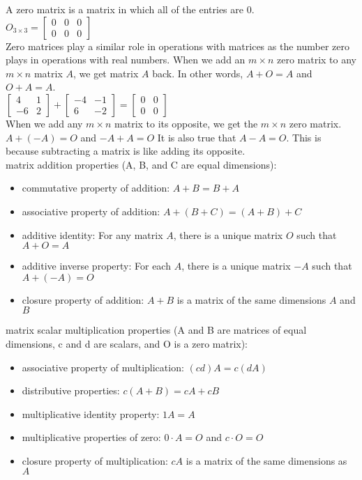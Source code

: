 \documentclass{article}
\begin{document}
A zero matrix is a matrix in which all of the entries are 0.\\

$O_{3 \times 3} = 
\begin{bmatrix}
	0 & 0 & 0\\
	0 & 0 & 0
\end{bmatrix}
$\\

Zero matrices play a similar role in operations with matrices as the number zero plays in operations with real numbers. When we add an $m \times n$ zero matrix to any $m \times n$ matrix $A$, we get matrix $A$ back. In other words, $A + O = A$ and $O + A = A$.\\

$
\begin{bmatrix}
	4 & 1\\
	-6 & 2
\end{bmatrix}
+
\begin{bmatrix}
	-4 & -1\\
	6 & -2
\end{bmatrix}
=
\begin{bmatrix}
	0 & 0\\
	0 & 0
\end{bmatrix}
$\\

When we add any $m \times n$ matrix to its opposite, we get the $m \times n$ zero matrix. $A + (-A) = O$ and $-A + A = O$ It is also true that $A - A = O$. This is because subtracting a matrix is like adding its opposite.\\

matrix addition properties (A, B, and C are equal dimensions):
	\begin{itemize}
		\item commutative property of addition: $A + B = B + A$
		\item associative property of addition: $A + (B + C) = (A + B) + C$
		\item additive identity: For any matrix $A$, there is a unique matrix $O$ such that $A + O = A$
		\item additive inverse property: For each $A$, there is a unique matrix $-A$ such that $A + (-A) = O$
		\item closure property of addition: $A + B$ is a matrix of the same dimensions $A$ and $B$
	\end{itemize}

matrix scalar multiplication properties (A and B are matrices of equal dimensions, c and d are scalars, and O is a zero matrix):
	\begin{itemize}
		\item associative property of multiplication: $(cd)A = c(dA)$
		\item distributive properties: $c(A + B) = cA + cB$
		\item multiplicative identity property: $1A = A$
		\item multiplicative properties of zero: $0 \cdot A = O$ and $c \cdot O = O$
		\item closure property of multiplication: $cA$ is a matrix of the same dimensions as $A$
	\end{itemize}
\end{document}
